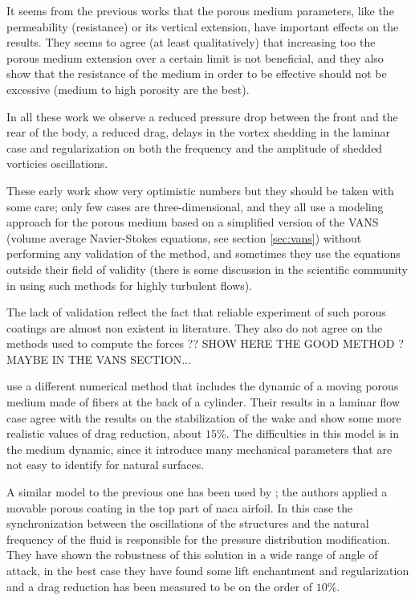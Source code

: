 It seems from the previous works that the porous medium parameters, like the permeability (resistance) or its vertical extension, have important effects on the results.
They seems to agree (at least qualitatively) that increasing too the porous medium extension over a certain limit is not beneficial, and they also show that the resistance of the medium in order to be effective should not be excessive (medium to high porosity are the best).

In all these work we observe a reduced pressure drop between the front and the rear of the body, a reduced drag, delays in the vortex shedding in the laminar case and regularization on both the frequency and the amplitude of shedded vorticies oscillations.

These early work show very optimistic numbers but they should be taken with some care; only few cases are three-dimensional, and they all use a modeling approach for the porous medium based on a simplified version of the VANS (volume average Navier-Stokes equations, see section \ref{sec:vans}) without performing any validation of the method, and sometimes they use the equations outside their field of validity (there is some discussion in the scientific community in using such methods for highly turbulent flows).

The lack of validation reflect the fact that reliable experiment of such porous coatings are almost non existent in literature.
They also do not agree on the methods used to compute the forces \citet{caltagirone1994interaction}?? SHOW HERE THE GOOD METHOD ? MAYBE IN THE VANS SECTION...


\citet{favier2009passive} use a different numerical method that includes the dynamic of a moving porous medium made of fibers at the back of a cylinder.
Their results in a laminar flow case agree with the results on the stabilization of the wake and show some more realistic values of drag reduction, about $15\%$.
The difficulties in this model is in the medium dynamic, since it introduce many mechanical parameters that are not easy to identify for natural surfaces.

A similar model to the previous one has been used by \citet{venkataraman2012numerical}; the authors applied a movable porous coating in the top part of naca airfoil.
In this case the synchronization between the oscillations of the structures and the natural frequency of the fluid is responsible for the pressure distribution modification.
They have shown the robustness of this solution in a wide range of angle of attack, in the best case they have found some lift enchantment and regularization and a drag reduction has been measured to be on the order of $10\%$.

